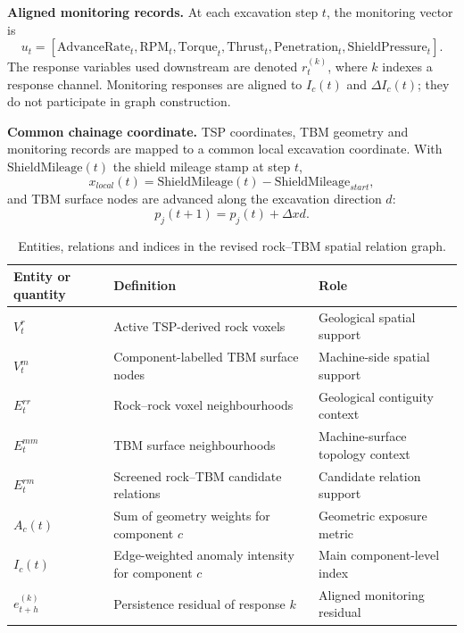 \textbf{Aligned monitoring records.} At each excavation step $t$, the monitoring vector is
\begin{equation}
u_t=[\mathrm{AdvanceRate}_t,\mathrm{RPM}_t,\mathrm{Torque}_t,\mathrm{Thrust}_t,\mathrm{Penetration}_t,\mathrm{ShieldPressure}_t].
\end{equation}
The response variables used downstream are denoted $r_t^{(k)}$, where $k$ indexes a response channel. Monitoring responses are aligned to $I_c(t)$ and $\Delta I_c(t)$; they do not participate in graph construction.

\textbf{Common chainage coordinate.} TSP coordinates, TBM geometry and monitoring records are mapped to a common local excavation coordinate. With $\mathrm{ShieldMileage}(t)$ the shield mileage stamp at step $t$,
\begin{equation}
x_{local}(t)=\mathrm{ShieldMileage}(t)-\mathrm{ShieldMileage}_{start},
\end{equation}
and TBM surface nodes are advanced along the excavation direction $d$:
\begin{equation}
p_j(t+1)=p_j(t)+\Delta x d.
\end{equation}

\begin{table}[!htbp]
\centering
\caption{Entities, relations and indices in the revised rock--TBM spatial relation graph.}
\label{tab:entity_model}
\small
\begin{tabular}{@{}p{}p{}p{}@{}}
\toprule
Entity or quantity & Definition & Role \\
\midrule
$V_t^r$ & Active TSP-derived rock voxels & Geological spatial support \\
$V_t^m$ & Component-labelled TBM surface nodes & Machine-side spatial support \\
$E_t^{rr}$ & Rock--rock voxel neighbourhoods & Geological contiguity context \\
$E_t^{mm}$ & TBM surface neighbourhoods & Machine-surface topology context \\
$E_t^{rm}$ & Screened rock--TBM candidate relations & Candidate relation support \\
$A_c(t)$ & Sum of geometry weights for component $c$ & Geometric exposure metric \\
$I_c(t)$ & Edge-weighted anomaly intensity for component $c$ & Main component-level index \\
$e_{t+h}^{(k)}$ & Persistence residual of response $k$ & Aligned monitoring residual \\
\bottomrule
\end{tabular}
\end{table}

